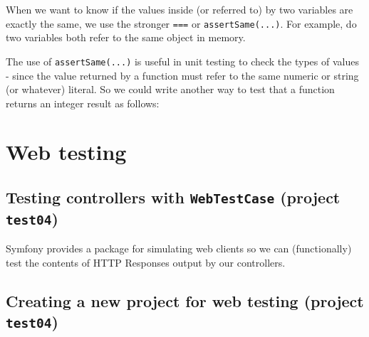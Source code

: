 \documentclass[a4paperpaper,openright]{book}
\newenvironment{Shaded}{}{}
\newcommand{\CommentTok}[1]{\textcolor[rgb]{0.38,0.63,0.69}{\textit{#1}}}
\newcommand{\DecValTok}[1]{\textcolor[rgb]{0.25,0.63,0.44}{#1}}
\newcommand{\KeywordTok}[1]{\textcolor[rgb]{0.00,0.44,0.13}{\textbf{#1}}}
\newcommand{\NormalTok}[1]{#1}
\newcommand{\OtherTok}[1]{\textcolor[rgb]{0.00,0.44,0.13}{#1}}
\begin{document}
When we want to know if the values inside (or referred to) by two
variables are exactly the same, we use the stronger \texttt{===} or
\texttt{assertSame(...)}. For example, do two variables both refer to
the same object in memory.

The use of \texttt{assertSame(...)} is useful in unit testing to check
the types of values - since the value returned by a function must refer
to the same numeric or string (or whatever) literal. So we could write
another way to test that a function returns an integer result as
follows:

\begin{Shaded}
\end{Shaded}

\hypertarget{web-testing}{%
\chapter{Web testing}\label{web-testing}}

\hypertarget{testing-controllers-with-webtestcase-project-test04}{%
\section{\texorpdfstring{Testing controllers with \texttt{WebTestCase}
(project
\texttt{test04})}{Testing controllers with WebTestCase (project test04)}}\label{testing-controllers-with-webtestcase-project-test04}}

Symfony provides a package for simulating web clients so we can
(functionally) test the contents of HTTP Responses output by our
controllers.

\hypertarget{creating-a-new-project-for-web-testing-project-test04}{%
\section{\texorpdfstring{Creating a new project for web testing (project
\texttt{test04})}{Creating a new project for web testing (project test04)}}\label{creating-a-new-project-for-web-testing-project-test04}}
\end{document}
